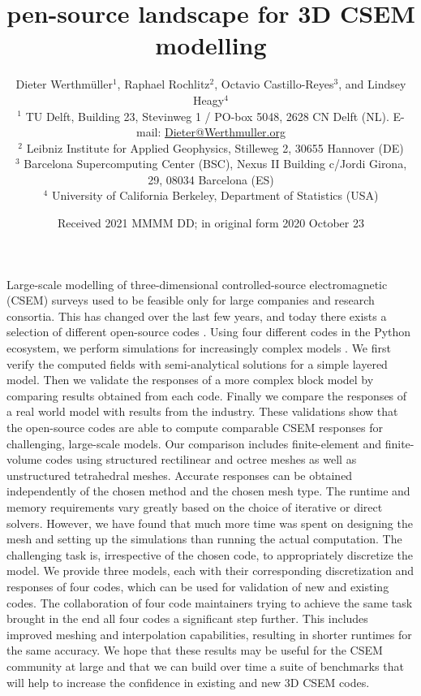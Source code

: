 \documentclass[extra, camera,%
]{gji}
\title[3D CSEM Open-Source Landscape]{\replaced{Towards an o}{O}pen-source landscape for 3D CSEM modelling}
\author[D. Werthmüller \emph{et al.}]
  {\Large Dieter Werthmüller$^1$,  %
   Raphael Rochlitz$^2$,           %
   Octavio Castillo-Reyes$^3$, and %
   Lindsey Heagy$^4$\\             %
   \footnotesize
  $^1$ TU Delft, Building 23, Stevinweg 1 / PO-box 5048, 2628 CN Delft (NL).
  E-mail: \href{mailto:Dieter@Werthmuller.org}{Dieter@Werthmuller.org}\\[-.3em]
   \footnotesize
  $^2$ Leibniz Institute for Applied Geophysics, Stilleweg 2, 30655 Hannover (DE)\\[-.3em]
   \footnotesize
   $^3$ Barcelona Supercomputing Center (BSC), Nexus II Building c/Jordi Girona, 29, 08034 Barcelona (ES)\\[-.3em]
   \footnotesize
  $^4$ University of California Berkeley, Department of Statistics (USA)
  }
\date{Received 2021 MMMM DD; in original form 2020 October 23}
\makeatletter
\let\zz@tabular\@tabular
\let\zzendtabular\endtabular
\let\zz@xtabularcr\@xtabularcr
\let\zz@tabclassz\@tabclassz
\let\zz@tabclassiv \@tabclassiv
\let\zz@tabarray\@tabarray
\makeatother
\begin{document}
\label{firstpage}

{\makeatletter
\let\@tabular\zz@tabular
\let\endtabular\zzendtabular
\let\@xtabularcr\zz@xtabularcr
\let\@tabclassz\zz@tabclassz
\let\@tabclassiv \zz@tabclassiv 
\let\@tabarray\zz@tabarray
\maketitle
}

\begin{summary}
Large-scale modelling of three-dimensional controlled-source electromagnetic (CSEM) surveys used to be feasible only for large companies and research consortia. This has changed over the last few years, and today there exists a selection of different open-source codes . Using four different codes in the Python ecosystem, we perform simulations for increasingly complex models . We first verify the computed fields with semi-analytical solutions for a simple layered model. Then we validate the responses of a more complex block model by comparing results obtained from each code. Finally we compare the responses of a real world model with results from the industry. These validations show that the open-source codes are able to compute comparable CSEM responses for challenging, large-scale models. Our comparison includes finite-element and finite-volume codes using structured rectilinear and octree meshes as well as unstructured tetrahedral meshes. Accurate responses can be obtained independently of the chosen method and the chosen mesh type. The runtime and memory requirements vary greatly based on the choice of iterative or direct solvers. However, we have found that much more time was spent on designing the mesh and setting up the simulations than running the actual computation. The challenging task is, irrespective of the chosen code, to appropriately discretize the model. We provide three models, each with their corresponding discretization and responses of four codes, which can be used for validation of new and existing codes. The collaboration of four code maintainers trying to achieve the same task brought in the end all four codes a significant step further. This includes improved meshing and interpolation capabilities, resulting in shorter runtimes for the same accuracy. We hope that these results may be useful for the CSEM community at large and that we can build over time a suite of benchmarks that will help to increase the confidence in existing and new 3D CSEM codes.
\end{summary}
\end{document}
